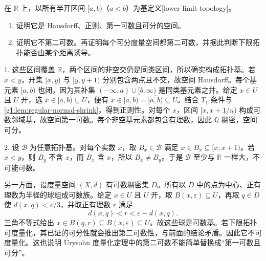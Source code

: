 \begin{exercise}\label{g1:ex:lower-limit-topology}
	在 \(\mathbb R\) 上，以所有半开区间 \([a,b)\)（\(a<b\)）为基定义[lower limit topology]。
	\begin{enumerate}
		\item 证明它是 Hausdorff、正则、第一可数且可分的空间。
		\item 证明它不第二可数。再证明每个可分度量空间都第二可数，并据此判断下限拓扑能否由某个距离诱导。
	\end{enumerate}
\end{exercise}
\begin{solution}
	1. 这些区间覆盖 \(\mathbb R\)，两个区间的非空交仍是同类区间，所以确实构成拓扑基。若 \(x<y\)，开集 \([x,y)\) 与 \([y,y+1)\) 分别包含两点且不交，故空间 Hausdorff。每个基元素 \([a,b)\) 也闭，因为其补集 \((-\infty,a)\cup[b,\infty)\) 是同类基元素之并。给定 \(x\in U\) 且 \(U\) 开，选 \(x\in[a,b)\subseteq U\)，便有 \(x\in[a,b)=\overline{[a,b)}\subseteq U\)。结合 \(T_1\) 条件与\cref{g1:lem:regular-normal-shrink}，得到正则性。对每个 \(x\)，区间 \([x,x+1/n)\) 构成可数邻域基，故空间第一可数。每个非空基元素都包含有理数，因此 \(\mathbb Q\) 稠密，空间可分。

	2. 设 \(\mathcal B\) 为任意拓扑基。对每个实数 \(x\)，取 \(B_x\in\mathcal B\) 满足 \(x\in B_x\subseteq[x,x+1)\)。若 \(x<y\)，则 \(B_y\) 不含 \(x\)，而 \(B_x\) 含 \(x\)，所以 \(B_x\ne B_y\)。于是 \(\mathcal B\) 至少与 \(\mathbb R\) 一样大，不可能可数。

	另一方面，设度量空间 \((X,d)\) 有可数稠密集 \(D\)。所有以 \(D\) 中的点为中心、正有理数为半径的球组成可数族。给定 \(x\in U\) 且 \(U\) 开，取 \(B(x,\varepsilon)\subseteq U\)，再取 \(q\in D\) 使 \(d(x,q)<\varepsilon/3\)，并取正有理数 \(r\) 满足
	\[
		d(x,q)<r<\varepsilon-d(x,q).
	\]
	三角不等式给出 \(x\in B(q,r)\subseteq B(x,\varepsilon)\subseteq U\)。故这些球是可数基。若下限拓扑可度量化，其已证的可分性就会推出第二可数性，与前面的结论矛盾。因此它不可度量化。这也说明 Urysohn 度量化定理中的第二可数不能简单替换成“第一可数且可分”。
\end{solution}

